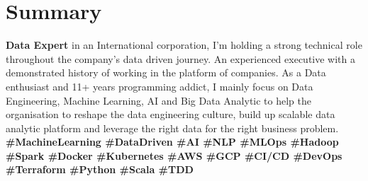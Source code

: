 \section{Summary}
  \textbf{Data Expert} in an International corporation, I’m holding a strong technical role throughout the company’s data driven journey. An experienced executive with a demonstrated history of working in the platform of companies. As a Data enthusiast and 11+ years programming addict, I mainly focus on Data Engineering, Machine Learning, AI and Big Data Analytic to help the organisation to reshape the data engineering culture, build up scalable data analytic platform and leverage the right data for the right business problem.
  \textbf{\scriptsize{
    \#MachineLearning
    \#DataDriven
    \#AI
    \#NLP
    \#MLOps
    \#Hadoop
    \#Spark
    \#Docker
    \#Kubernetes
    \#AWS
    \#GCP
    \#CI/CD
    \#DevOps
    \#Terraform
    \#Python
    \#Scala
    \#TDD
  }}
